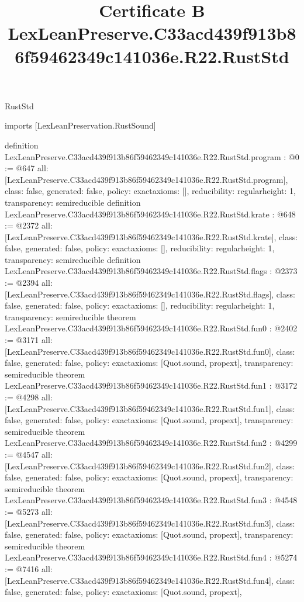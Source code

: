 \begin{lexlean}{RustStd}
\title{Certificate B LexLeanPreserve.C33acd439f913b86f59462349c141036e.R22.RustStd}
\begin{coremodule}
imports [LexLeanPreservation.RustSound]

definition LexLeanPreserve.C33acd439f913b86f59462349c141036e.R22.RustStd.program : @0 := @647 {
  all: [LexLeanPreserve.C33acd439f913b86f59462349c141036e.R22.RustStd.program],
  class: false,
  generated: false,
  policy: exact{axioms: []},
  reducibility: regular{height: 1},
  transparency: semireducible
}
definition LexLeanPreserve.C33acd439f913b86f59462349c141036e.R22.RustStd.krate : @648 := @2372 {
  all: [LexLeanPreserve.C33acd439f913b86f59462349c141036e.R22.RustStd.krate],
  class: false,
  generated: false,
  policy: exact{axioms: []},
  reducibility: regular{height: 1},
  transparency: semireducible
}
definition LexLeanPreserve.C33acd439f913b86f59462349c141036e.R22.RustStd.flags : @2373 := @2394 {
  all: [LexLeanPreserve.C33acd439f913b86f59462349c141036e.R22.RustStd.flags],
  class: false,
  generated: false,
  policy: exact{axioms: []},
  reducibility: regular{height: 1},
  transparency: semireducible
}
theorem LexLeanPreserve.C33acd439f913b86f59462349c141036e.R22.RustStd.fun0 : @2402 := @3171 {
  all: [LexLeanPreserve.C33acd439f913b86f59462349c141036e.R22.RustStd.fun0],
  class: false,
  generated: false,
  policy: exact{axioms: [Quot.sound, propext]},
  transparency: semireducible
}
theorem LexLeanPreserve.C33acd439f913b86f59462349c141036e.R22.RustStd.fun1 : @3172 := @4298 {
  all: [LexLeanPreserve.C33acd439f913b86f59462349c141036e.R22.RustStd.fun1],
  class: false,
  generated: false,
  policy: exact{axioms: [Quot.sound, propext]},
  transparency: semireducible
}
theorem LexLeanPreserve.C33acd439f913b86f59462349c141036e.R22.RustStd.fun2 : @4299 := @4547 {
  all: [LexLeanPreserve.C33acd439f913b86f59462349c141036e.R22.RustStd.fun2],
  class: false,
  generated: false,
  policy: exact{axioms: [Quot.sound, propext]},
  transparency: semireducible
}
theorem LexLeanPreserve.C33acd439f913b86f59462349c141036e.R22.RustStd.fun3 : @4548 := @5273 {
  all: [LexLeanPreserve.C33acd439f913b86f59462349c141036e.R22.RustStd.fun3],
  class: false,
  generated: false,
  policy: exact{axioms: [Quot.sound, propext]},
  transparency: semireducible
}
theorem LexLeanPreserve.C33acd439f913b86f59462349c141036e.R22.RustStd.fun4 : @5274 := @7416 {
  all: [LexLeanPreserve.C33acd439f913b86f59462349c141036e.R22.RustStd.fun4],
  class: false,
  generated: false,
  policy: exact{axioms: [Quot.sound, propext]},
}
\end{coremodule}
\end{lexlean}
